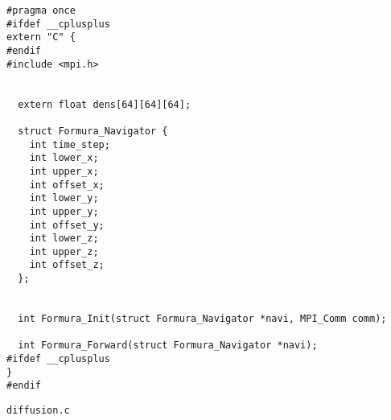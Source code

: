 \begin{breakbox}
\begin{verbatim}
#pragma once
#ifdef __cplusplus
extern "C" {
#endif
#include <mpi.h>


  extern float dens[64][64][64];

  struct Formura_Navigator {
    int time_step;
    int lower_x;
    int upper_x;
    int offset_x;
    int lower_y;
    int upper_y;
    int offset_y;
    int lower_z;
    int upper_z;
    int offset_z;
  };


  int Formura_Init(struct Formura_Navigator *navi, MPI_Comm comm);

  int Formura_Forward(struct Formura_Navigator *navi);
#ifdef __cplusplus
}
#endif
\end{verbatim}
\end{breakbox}

\verb`diffusion.c`

